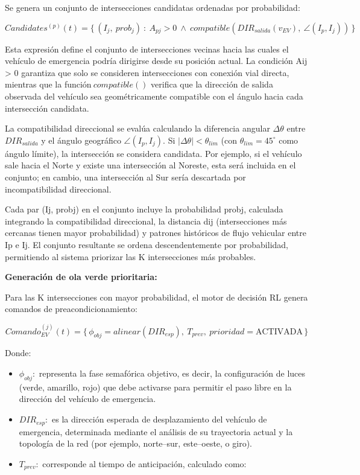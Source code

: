 \documentclass[12pt,a4paper,oneside]{report}
\begin{document}
Se genera un conjunto de intersecciones candidatas ordenadas por probabilidad:

\begin{equation}
Candidates^{(p)}(t) = \{\,(I_{j},\ prob_{j})\ :\ A_{pj} > 0 \ \land\ compatible\!\left(DIR_{salida}(v_{EV}),\ \angle(I_{p},I_{j})\right)\,\}
\label{eq:candidates}
\end{equation}

Esta expresión define el conjunto de intersecciones vecinas hacia las cuales el vehículo de emergencia podría dirigirse desde su posición actual. La condición Aij \textgreater{} 0 garantiza que solo se consideren intersecciones con conexión vial directa, mientras que la función\(\ compatible()\) verifica que la dirección de salida observada del vehículo sea geométricamente compatible con el ángulo hacia cada intersección candidata.

La compatibilidad direccional se evalúa calculando la diferencia angular \(\Delta\theta\) entre \(DIR_{salida}\) y el ángulo geográfico \(\angle(I_{p}, I_{j})\). Si \(|\Delta\theta| < \theta_{lim}\) (con \(\theta_{lim} = 45^{\circ}\) como ángulo límite), la intersección se considera candidata. Por ejemplo, si el vehículo sale hacia el Norte y existe una intersección al Noreste, esta será incluida en el conjunto; en cambio, una intersección al Sur sería descartada por incompatibilidad direccional.

Cada par (Ij, probj) en el conjunto incluye la probabilidad probj, calculada integrando la compatibilidad direccional, la distancia dij (intersecciones más cercanas tienen mayor probabilidad) y patrones históricos de flujo vehicular entre Ip e Ij. El conjunto resultante se ordena descendentemente por probabilidad, permitiendo al sistema priorizar las K intersecciones más probables.

\textbf{Generación de ola verde prioritaria:}

Para las K intersecciones con mayor probabilidad, el motor de decisión RL genera comandos de preacondicionamiento:

\begin{equation}
Comando_{EV}^{(j)}(t) = \{\, \phi_{obj} = alinear(DIR_{esp}),\ T_{prev},\ prioridad = \text{ACTIVADA} \,\}
\label{eq:comandoev}
\end{equation}

Donde:

\begin{itemize}
\item
  \(\phi_{obj}:\) representa la fase semafórica objetivo, es decir, la configuración de luces (verde, amarillo, rojo) que debe activarse para permitir el paso libre en la dirección del vehículo de emergencia.
\item
  \(DIR_{esp}:\) es la dirección esperada de desplazamiento del vehículo de emergencia, determinada mediante el análisis de su trayectoria actual y la topología de la red (por ejemplo, norte--sur, este--oeste, o giro).
\item
  \(T_{prev}:\) corresponde al tiempo de anticipación, calculado como:
\end{itemize}
\end{document}
